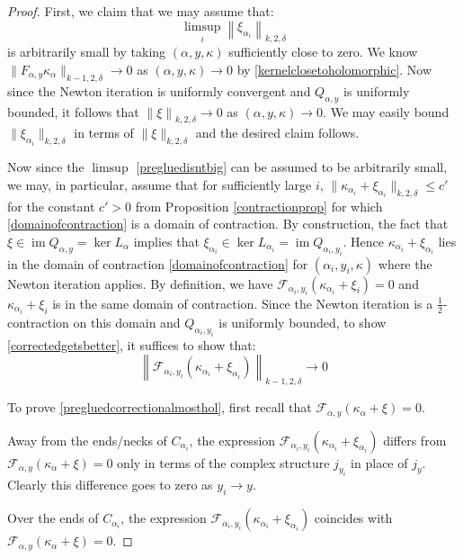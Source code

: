 \documentclass[12pt]{article}
\theoremstyle{definition}
\theoremstyle{remark}
\numberwithin{equation}{subsection}
\newcommand{\F}{\mathcal F}
\newcommand{\im}{\operatorname{im}}
\begin{document}
\begin{proof}
First, we claim that we may assume that:
\begin{equation}\label{pregluedisntbig}
\limsup_i\left\|\xi_{\alpha_i}\right\|_{k,2,\delta}
\end{equation}
is arbitrarily small by taking $(\alpha,y,\kappa)$ sufficiently close to zero.  We know $\|F_{\alpha,y}\kappa_\alpha\|_{k-1,2,\delta}\to 0$ as $(\alpha,y,\kappa)\to 0$ by \eqref{kernelclosetoholomorphic}.  Now since the Newton iteration is uniformly convergent and $Q_{\alpha,y}$ is uniformly bounded, it follows that $\left\|\xi\right\|_{k,2,\delta}\to 0$ as $(\alpha,y,\kappa)\to 0$.  We may easily bound $\|\xi_{\alpha_i}\|_{k,2,\delta}$ in terms of $\|\xi\|_{k,2,\delta}$ and the desired claim follows.

Now since the $\limsup$ \eqref{pregluedisntbig} can be assumed to be arbitrarily small, we may, in particular, assume that for sufficiently large $i$, $\|\kappa_{\alpha_i}+\xi_{\alpha_i}\|_{k,2,\delta}\leq c'$ for the constant $c'>0$ from Proposition \ref{contractionprop} for which \eqref{domainofcontraction} is a domain of contraction.  By construction, the fact that $\xi\in\im Q_{\alpha,y}=\ker L_\alpha$ implies that $\xi_{\alpha_i}\in\ker L_{\alpha_i}=\im Q_{\alpha_i,y_i}$.  Hence $\kappa_{\alpha_i}+\xi_{\alpha_i}$ lies in the domain of contraction \eqref{domainofcontraction} for $(\alpha_i,y_i,\kappa)$ where the Newton iteration applies.  By definition, we have $\F_{\alpha_i,y_i}(\kappa_{\alpha_i}+\xi_i)=0$ and $\kappa_{\alpha_i}+\xi_i$ is in the same domain of contraction.  Since the Newton iteration is a $\frac 12$-contraction on this domain and $Q_{\alpha_i,y_i}$ is uniformly bounded, to show \eqref{correctedgetsbetter}, it suffices to show that:
\begin{equation}\label{pregluedcorrectionalmosthol}
\left\|\F_{\alpha_i,y_i}(\kappa_{\alpha_i}+\xi_{\alpha_i})\right\|_{k-1,2,\delta}\to 0
\end{equation}

To prove \eqref{pregluedcorrectionalmosthol}, first recall that $\F_{\alpha,y}(\kappa_\alpha+\xi)=0$.

Away from the ends/necks of $C_{\alpha_i}$, the expression $\F_{\alpha_i,y_i}(\kappa_{\alpha_i}+\xi_{\alpha_i})$ differs from $\F_{\alpha,y}(\kappa_\alpha+\xi)=0$ only in terms of the complex structure $j_{y_i}$ in place of $j_y$.  Clearly this difference goes to zero as $y_i\to y$.

Over the ends of $C_{\alpha_i}$, the expression $\F_{\alpha_i,y_i}(\kappa_{\alpha_i}+\xi_{\alpha_i})$ coincides with $\F_{\alpha,y}(\kappa_\alpha+\xi)=0$.


\end{proof}
\end{document}
